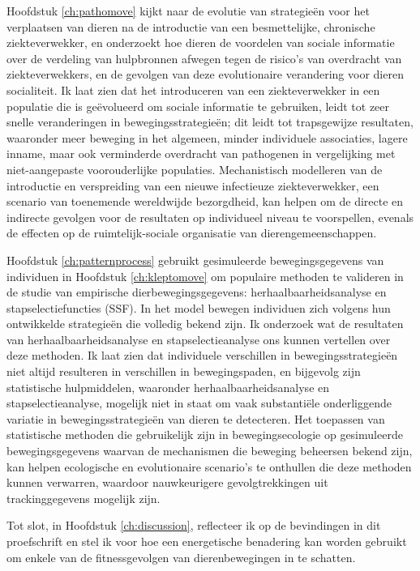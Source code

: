 Hoofdstuk \ref{ch:pathomove} kijkt naar de evolutie van strategie{\"e}n voor het verplaatsen van dieren na de introductie van een besmettelijke, chronische ziekteverwekker, en onderzoekt hoe dieren de voordelen van sociale informatie over de verdeling van hulpbronnen afwegen tegen de risico's van overdracht van ziekteverwekkers, en de gevolgen van deze evolutionaire verandering voor dieren socialiteit. Ik laat zien dat het introduceren van een ziekteverwekker in een populatie die is ge{\"e}volueerd om sociale informatie te gebruiken, leidt tot zeer snelle veranderingen in bewegingsstrategie{\"e}n; dit leidt tot trapsgewijze resultaten, waaronder meer beweging in het algemeen, minder individuele associaties, lagere inname, maar ook verminderde overdracht van pathogenen in vergelijking met niet-aangepaste voorouderlijke populaties. Mechanistisch modelleren van de introductie en verspreiding van een nieuwe infectieuze ziekteverwekker, een scenario van toenemende wereldwijde bezorgdheid, kan helpen om de directe en indirecte gevolgen voor de resultaten op individueel niveau te voorspellen, evenals de effecten op de ruimtelijk-sociale organisatie van dierengemeenschappen.

Hoofdstuk \ref{ch:patternprocess} gebruikt gesimuleerde bewegingsgegevens van individuen in Hoofdstuk \ref{ch:kleptomove} om populaire methoden te valideren in de studie van empirische dierbewegingsgegevens: herhaalbaarheidsanalyse en stapselectiefuncties (SSF). In het model bewegen individuen zich volgens hun ontwikkelde strategie{\"e}n die volledig bekend zijn. Ik onderzoek wat de resultaten van herhaalbaarheidsanalyse en stapselectieanalyse ons kunnen vertellen over deze methoden. Ik laat zien dat individuele verschillen in bewegingsstrategie{\"e}n niet altijd resulteren in verschillen in bewegingspaden, en bijgevolg zijn statistische hulpmiddelen, waaronder herhaalbaarheidsanalyse en stapselectieanalyse, mogelijk niet in staat om vaak substanti{\"e}le onderliggende variatie in bewegingsstrategie{\"e}n van dieren te detecteren.
Het toepassen van statistische methoden die gebruikelijk zijn in bewegingsecologie op gesimuleerde bewegingsgegevens waarvan de mechanismen die beweging beheersen bekend zijn, kan helpen ecologische en evolutionaire scenario's te onthullen die deze methoden kunnen verwarren, waardoor nauwkeurigere gevolgtrekkingen uit trackinggegevens mogelijk zijn.

Tot slot, in Hoofdstuk \ref{ch:discussion}, reflecteer ik op de bevindingen in dit proefschrift en stel ik voor hoe een energetische benadering kan worden gebruikt om enkele van de fitnessgevolgen van dierenbewegingen in te schatten.
